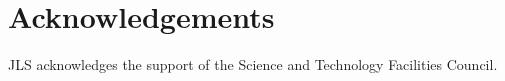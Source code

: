 \documentclass[useAMS,usenatbib,fleqn,a4paper]{mn2e}
\def\kpc{\,{\rm kpc}}
\def\kms{\,{\rm km\,s^{-1}}}
\def\rad{\,\rm rad}
\begin{document}
\section*{Acknowledgements}
JLS acknowledges the support of the Science and Technology Facilities
Council.






\end{document}
